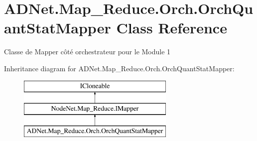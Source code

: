 \hypertarget{class_a_d_net_1_1_map___reduce_1_1_orch_1_1_orch_quant_stat_mapper}{}\section{A\+D\+Net.\+Map\+\_\+\+Reduce.\+Orch.\+Orch\+Quant\+Stat\+Mapper Class Reference}
\label{class_a_d_net_1_1_map___reduce_1_1_orch_1_1_orch_quant_stat_mapper}


Classe de Mapper côté orchestrateur pour le Module 1  


Inheritance diagram for A\+D\+Net.\+Map\+\_\+\+Reduce.\+Orch.\+Orch\+Quant\+Stat\+Mapper\+:\begin{figure}[H]
\begin{center}
\leavevmode
\includegraphics[height=3.000000cm]{class_a_d_net_1_1_map___reduce_1_1_orch_1_1_orch_quant_stat_mapper}
\end{center}
\end{figure}
